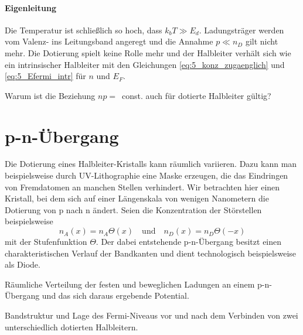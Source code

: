 \paragraph*{Eigenleitung} Die Temperatur ist schließlich so hoch, dass $k_b T \gg E_d$. Ladungsträger werden vom Valenz- ins Leitungsband angeregt und die Annahme $p \ll n_D$ gilt nicht mehr. Die Dotierung spielt keine Rolle mehr und der Halbleiter verhält sich wie ein intrinsischer Halbleiter mit den Gleichungen  \ref{eq:5_konz_zugaenglich} und  \ref{eq:5_Efermi_intr} für $n$ und $E_F$.


\begin{questions}
    \item Warum ist die Beziehung $n p = $~const. auch für dotierte Halbleiter gültig? 
\end{questions}

    


\section{p-n-Übergang}

Die Dotierung eines Halbleiter-Kristalls kann räumlich variieren. Dazu kann man beispielsweise durch UV-Lithographie eine Maske erzeugen, die das Eindringen von Fremdatomen an manchen Stellen verhindert. Wir betrachten hier einen Kristall, bei dem sich auf einer Längenskala von wenigen Nanometern die Dotierung von p nach n ändert.  Seien die Konzentration der Störstellen beispielsweise
\begin{equation}
    n_A(x) = n_A \Theta(x) \quad \text{und}  \quad  n_D(x) = n_D \Theta(-x) 
\end{equation}
mit der Stufenfunktion $\Theta$. Der dabei entstehende p-n-Übergang besitzt einen charakteristischen Verlauf der Bandkanten und dient technologisch beispielsweise als Diode.


\begin{marginfigure}[-110mm]
    \caption{Räumliche Verteilung der festen und beweglichen Ladungen an einem p-n-Übergang und das sich daraus ergebende Potential.}
\end{marginfigure}

\begin{marginfigure}[-10mm]
    \caption{Bandstruktur und Lage des Fermi-Niveaus vor und nach dem Verbinden  von zwei unterschiedlich dotierten Halbleitern.}
\end{marginfigure}

